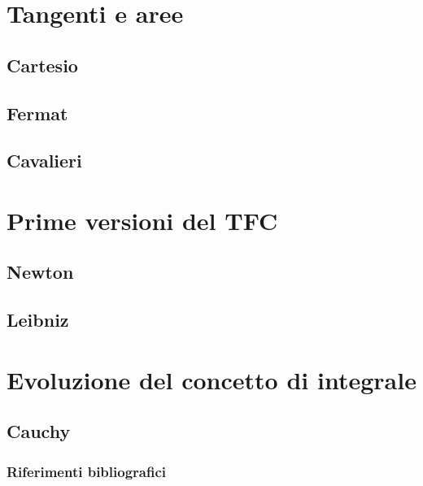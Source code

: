 \documentclass[8pt]{beamer}
\begin{document}
\section{Tangenti e aree}
\subsection{Cartesio}

\subsection{Fermat}


\subsection{Cavalieri}


\section{Prime versioni del TFC}
\subsection{Newton}

\subsection{Leibniz}


\section{Evoluzione del concetto di integrale}
\subsection{Cauchy}


\begin{frame} %

  \frametitle{Riferimenti bibliografici}
  
  \scriptsize{}
  
  
\end{frame}
\end{document}
